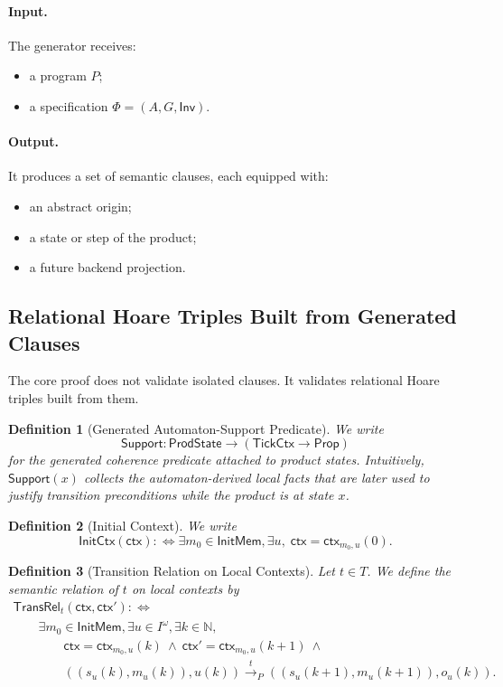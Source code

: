 \documentclass[11pt,a4paper]{article}
\newtheorem{definition}{Definition}[section]
\newcommand{\Nat}{\mathbb{N}}
\newcommand{\Stream}[1]{#1^\omega}
\newcommand{\TickCtx}{\mathsf{TickCtx}}
\newcommand{\UserInv}{\mathsf{Inv}}
\newcommand{\Support}{\mathsf{Support}}
\newcommand{\ctx}{\mathsf{ctx}}
\begin{document}
\paragraph{Input.}
The generator receives:
\begin{itemize}[leftmargin=1.4em]
\item a program \(P\);
\item a specification \(\Phi = (A,G,\UserInv)\).
\end{itemize}

\paragraph{Output.}
It produces a set of semantic clauses, each equipped with:
\begin{itemize}[leftmargin=1.4em]
\item an abstract origin;
\item a state or step of the product;
\item a future backend projection.
\end{itemize}

\subsection{Relational Hoare Triples Built from Generated Clauses}

The core proof does not validate isolated clauses. It validates relational
Hoare triples built from them.

\begin{definition}[Generated Automaton-Support Predicate]
We write
\[
\Support : \mathsf{ProdState} \to (\TickCtx \to \mathsf{Prop})
\]
for the generated coherence predicate attached to product states. Intuitively,
\(\Support(x)\) collects the automaton-derived local facts that are later used
to justify transition preconditions while the product is at state \(x\).
\end{definition}

\begin{definition}[Initial Context]
We write
\[
\mathsf{InitCtx}(\ctx) :\Longleftrightarrow
\exists m_0 \in \mathsf{InitMem},\exists u,\; \ctx = \ctx_{m_0,u}(0).
\]
\end{definition}

\begin{definition}[Transition Relation on Local Contexts]
Let \(t \in T\). We define the semantic relation of \(t\) on local contexts by
\[
\begin{array}{l}
\mathsf{TransRel}_t(\ctx,\ctx') :\Longleftrightarrow {}\\
\qquad \exists m_0 \in \mathsf{InitMem},\exists u \in \Stream{I},\exists k \in \Nat,\\
\qquad\qquad \ctx = \ctx_{m_0,u}(k)\ \land\ \ctx' = \ctx_{m_0,u}(k+1)\ \land\\
\qquad\qquad ((s_u(k),m_u(k)),u(k)) \xrightarrow{\,t\,}_P
((s_u(k+1),m_u(k+1)),o_u(k)).
\end{array}
\]
\end{definition}
\end{document}
